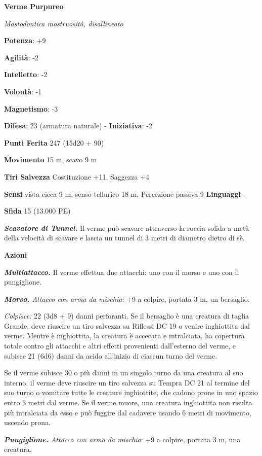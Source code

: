 \begin{multicols}{2}
\textbf{Verme Purpureo}

\emph{Mastodontica mostruosità, disallineato}

\textbf{Potenza}: +9

\textbf{Agilità}: -2

\textbf{Intelletto}: -2

\textbf{Volontà}: -1

\textbf{Magnetismo}: -3

\textbf{Difesa}: 23 (armatura naturale) - \textbf{Iniziativa}: -2

\textbf{Punti Ferita} 247 (15d20 + 90)

\textbf{Movimento} 15 m, scavo 9 m

\textbf{Tiri Salvezza} Costituzione +11, Saggezza +4

\textbf{Sensi} vista cieca 9 m, senso tellurico 18 m, Percezione passiva
9 \textbf{Linguaggi} -

\textbf{Sfida} 15 (13.000 PE)

\emph{\textbf{Scavatore di Tunnel.}} Il verme può scavare attraverso la
roccia solida a metà della velocità di scavare e lascia un tunnel di 3
metri di diametro dietro di sè.

\textbf{Azioni}

\emph{\textbf{Multiattacco.}} Il verme effettua due attacchi: uno con il
morso e uno con il pungiglione.

\emph{\textbf{Morso.} Attacco con arma da mischia}: +9 a colpire,
portata 3 m, un bersaglio.

\emph{Colpisce:} 22 (3d8 + 9) danni perforanti. Se il bersaglio è una
creatura di taglia Grande, deve riuscire un tiro salvezza su Riflessi
DC 19 o venire inghiottita dal verme. Mentre è inghiottita, la creatura
è accecata e intralciata, ha copertura totale contro gli attacchi e
altri effetti provenienti dall'esterno del verme, e subisce 21 (6d6)
danni da acido all'inizio di ciascun turno del verme.

Se il verme subisce 30 o più danni in un singolo turno da una creatura
al suo interno, il verme deve riuscire un tiro salvezza su Tempra
DC 21 al termine del suo turno o vomitare tutte le creature inghiottite,
che cadono prone in uno spazio entro 3 metri dal verme. Se il verme
muore, una creatura inghiottita non risulta più intralciata da esso e
può fuggire dal cadavere usando 6 metri di movimento, uscendo prona.

\emph{\textbf{Pungiglione.} Attacco con arma da mischia}: +9 a colpire,
portata 3 m, una creatura.


\end{multicols}
